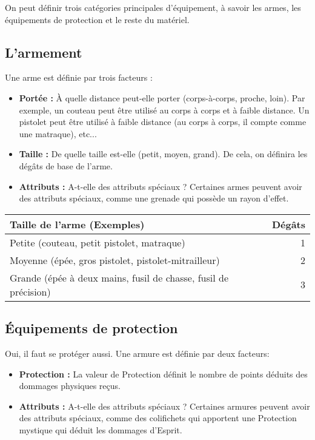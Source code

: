 \documentclass[twoside,12pt,english]{book}
\begin{document}
On peut définir trois catégories principales d'équipement, à savoir les armes, les équipements de protection et le reste du matériel.

\subsection{L'armement}

Une arme est définie par trois facteurs :

\begin{itemize}
\item \textbf{Portée :} À quelle distance peut-elle porter (corps-à-corps, proche, loin). Par exemple, un couteau peut être utilisé au corps à corps et à faible distance. Un pistolet peut être utilisé à faible distance (au corps à corps, il compte comme une matraque), etc...
\item \textbf{Taille :} De quelle taille est-elle (petit, moyen, grand). De cela, on définira les dégâts de base de l'arme.
\item \textbf{Attributs :} A-t-elle des attributs spéciaux ? Certaines armes peuvent avoir des attributs spéciaux, comme une grenade qui possède un rayon d'effet.
\end{itemize}

\begin{tabular}{lr}\\\toprule  
Taille de l'arme (Exemples) & Dégâts \\\midrule
Petite (couteau, petit pistolet, matraque) & 1 \\  
Moyenne (épée, gros pistolet, pistolet-mitrailleur) & 2 \\ 
Grande (épée à deux mains, fusil de chasse, fusil de précision) & 3 \\  \bottomrule
\end{tabular}

\subsection{Équipements de protection}

Oui, il faut se protéger aussi. Une armure est définie par deux facteurs: 

\begin{itemize}
\item \textbf{Protection :} La valeur de Protection définit le nombre de points déduits des dommages physiques reçus.
\item \textbf{Attributs :} A-t-elle des attributs spéciaux ? Certaines armures peuvent avoir des attributs spéciaux, comme des colifichets qui apportent une Protection mystique qui déduit les dommages d'Esprit.
\end{itemize}
\end{document}
